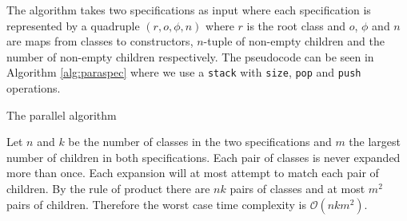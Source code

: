 The algorithm takes two specifications as input where each specification is represented by a quadruple $(r,o,\phi,n)$ where $r$ is the root class and $o$, $\phi$ and $n$ are maps from classes to constructors, $n$-tuple of non-empty children and the number of non-empty children respectively. The pseudocode can be seen in Algorithm \ref{alg:paraspec} where we use a \texttt{stack} with \texttt{size}, \texttt{pop} and \texttt{push} operations. 

\begin{algorithm}

\caption{The parallel algorithm}
\label{alg:paraspec}
\end{algorithm}

Let $n$ and $k$ be the number of classes in the two specifications and $m$ the largest number of children in both specifications. Each pair of classes is never expanded more than once. Each expansion will at most attempt to match each pair of children. By the rule of product there are $nk$ pairs of classes and at most $m^2$ pairs of children. Therefore the worst case time complexity is $\mathcal{O}(nkm^2)$.